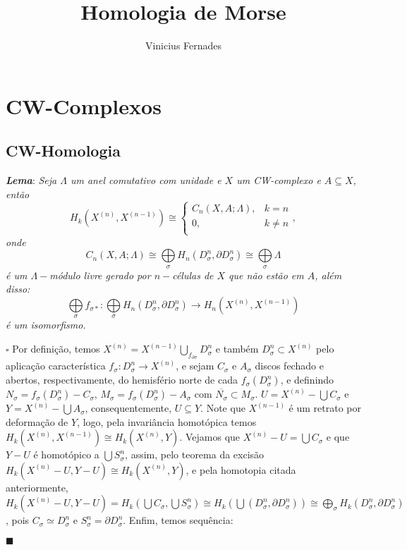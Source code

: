 \documentclass[12pt]{book}
\newcommand{\celula}[2]{D^{#1}_{#2}}
\newcommand{\celulafront}[2]{\partial D^{#1}_{#2}}
\newcommand{\skeleton}[1]{X^{(#1)}}
\newcommand{\homologia}[2]{H_{#1}(#2)}
\newcommand{\homologiarel}[3]{H_{#1}(#2,#3)}
\newcommand{\homologiarelcel}[3]{H_{#1}(D^{#2}_{#3}, \partial D^{#2}_{#3})}
\newcommand{\homologiarelskelesimpl}[2]{H_{#1}(X^{(#2)}, X^{(#2-1)})}
\newcommand{\somadir}[1]{\bigoplus \limits_{#1}}
\newcommand{\tese}[3]{\vspace{2mm} \textit{\textbf{#1}}: \textit{#2} \par $\square$ #3 \par $\blacksquare$}
\begin{document}
	
	\title{Homologia de Morse}
	
	\author{Vinicius Fernades}
	
	\maketitle
	
	\chapter{CW-Complexos}
	\section{CW-Homologia}
	\tese{Lema}{Seja $\Lambda$ um anel comutativo com unidade e $X$ um CW-complexo e $A \subseteq X$, então 
	$$
	\homologiarelskelesimpl{k}{n} \cong 
	\left\{
		\begin{array}{cc}
		C_{n}(X, A;\Lambda) , & k = n\\
		0, & k\neq n\\
		\end{array}
	\right.,
	$$
	onde 
	$$
	C_{n}(X, A;\Lambda) \cong \somadir{\sigma} \homologiarelcel{n}{n}{\sigma} \cong \somadir{\sigma} \Lambda
	$$
	é um $\Lambda-$módulo livre gerado por $n-$células de $X$ que não estão em $A$, além disso:
	$$
	\somadir{\sigma}f_{\sigma*}: \somadir{\sigma} \homologiarelcel{n}{n}{\sigma} \to \homologiarelskelesimpl{n}{n}
	$$
	é um isomorfismo.}{Por definição, temos  $\skeleton{n} = \skeleton{n-1} \bigcup_{f_{\partial \sigma} } \celula{n}{\sigma}$ e também $\celula{n}{\sigma} \subset \skeleton{n}$ pelo aplicação característica $f_{\sigma} : \celula{n}{\sigma} \to \skeleton{n}$, e sejam $C_{\sigma}$ e $A_{\sigma}$ discos fechado e abertos, respectivamente, do hemisfério norte de cada $f_{\sigma}(\celula{n}{\sigma})$, e definindo $N_{\sigma} = f_{\sigma}(\celula{n}{\sigma}) - C_{\sigma}$, $M_{\sigma} = f_{\sigma}(\celula{n}{\sigma}) - A_{\sigma}$ com $\overline{N_{\sigma}} \subset M_{\sigma}$. $U = \skeleton{n} - \bigcup C_{\sigma}$ e $Y = \skeleton{n} - \bigcup A_{\sigma}$, consequentemente, $U \subseteq Y$. Note que $\skeleton{n-1}$ é um retrato por deformação de $Y$, logo, pela invariância homotópica temos $\homologiarel{k}{\skeleton{n}}{\skeleton{n-1}} \cong  \homologiarel{k}{\skeleton{n}}{Y}$. Vejamos que $\skeleton{n} - U = \bigcup C_{\sigma}$ e que $Y - U $ é homotópico a $\bigcup S^{n}_{\sigma}$, assim, pelo teorema da excisão $\homologiarel{k}{\skeleton{n} - U}{Y- U} \cong \homologiarel{k}{\skeleton{n}}{Y}$, e pela homotopia citada anteriormente, $\homologiarel{k}{\skeleton{n} - U}{Y- U} = \homologiarel{k}{\bigcup C_{\sigma}}{\bigcup S^{n}_{\sigma}} \cong \homologia{k}{\bigcup (\celula{n}{\sigma}, \celulafront{n}{\sigma})} \cong \somadir{\sigma} \homologiarelcel{k}{n}{\sigma}$, pois $C_{\sigma} \simeq \celula{n}{\sigma}$ e $S^{n}_{\sigma} = \celulafront{n}{\sigma}$. Enfim, temos sequência:
}
\end{document}
